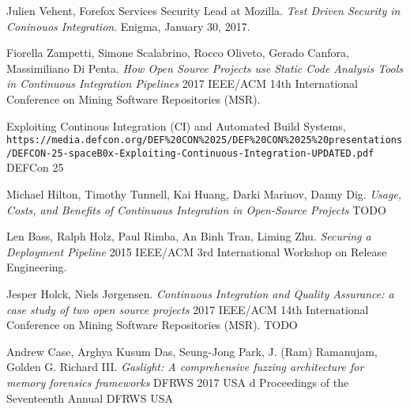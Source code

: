 \begin{thebibliography}{9}
Julien Vehent, Forefox Services Security Lead at Mozilla. 
\textit{Test Driven Security in Coninouos Integration}. 
Enigma, January 30, 2017.
 
Fiorella Zampetti, Simone Scalabrino, Rocco Oliveto, Gerado Canfora, Massimiliano Di Penta. 
\textit{How Open Source Projects use Static Code Analysis Tools in Continuous Integration Pipelines}
2017 IEEE/ACM 14th International Conference on Mining Software Repositories (MSR).
 
Exploiting Continous Integration (CI) and Automated Build Systems,
\\\texttt{https://media.defcon.org/DEF\%20CON\%2025/DEF\%20CON\%2025\%20presentations/DEFCON-25-spaceB0x-Exploiting-Continuous-Integration-UPDATED.pdf}
DEFCon 25

Michael Hilton, Timothy Tunnell, Kai Huang, Darki Marinov, Danny Dig. 
\textit{Usage, Costs, and Benefits of Continuous Integration in Open-Source Projects}
TODO

Len Bass, Ralph Holz, Paul Rimba, An Binh Tran, Liming Zhu. 
\textit{Securing a Deployment Pipeline}
2015 IEEE/ACM 3rd International Workshop on Release Engineering.

Jesper Holck, Niels Jørgensen.
\textit{Continuous Integration and Quality Assurance: a case study of two open source projects}
2017 IEEE/ACM 14th International Conference on Mining Software Repositories (MSR).
TODO

Andrew Case, Arghya Kusum Das, Seung-Jong Park, J. (Ram) Ramanujam, Golden G. Richard III.
\textit{Gaslight: A comprehensive fuzzing architecture for memory forensics
frameworks}
DFRWS 2017 USA d Proceedings of the Seventeenth Annual DFRWS USA

\end{thebibliography}
